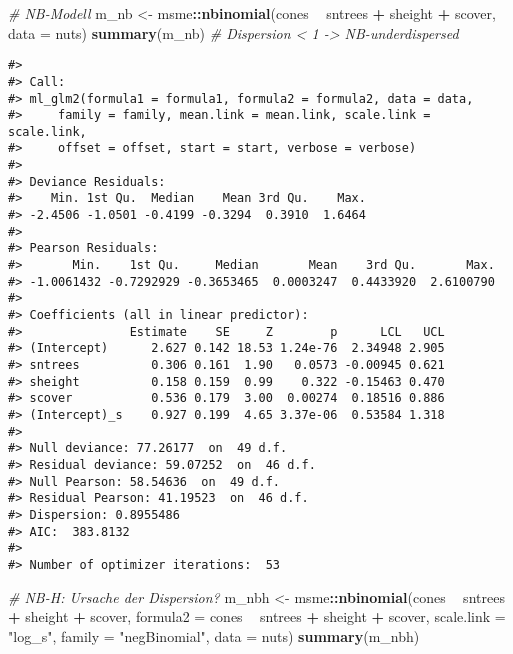 \documentclass[ngerman,a4paper,]{scrartcl}
\newenvironment{Shaded}{\begin{snugshade}}{\end{snugshade}}
\newcommand{\CommentTok}[1]{\textcolor[rgb]{0.56,0.35,0.01}{\textit{#1}}}
\newcommand{\DataTypeTok}[1]{\textcolor[rgb]{0.13,0.29,0.53}{#1}}
\newcommand{\KeywordTok}[1]{\textcolor[rgb]{0.13,0.29,0.53}{\textbf{#1}}}
\newcommand{\NormalTok}[1]{#1}
\newcommand{\OperatorTok}[1]{\textcolor[rgb]{0.81,0.36,0.00}{\textbf{#1}}}
\newcommand{\StringTok}[1]{\textcolor[rgb]{0.31,0.60,0.02}{#1}}
\theoremstyle{definition}
\theoremstyle{definition}
\theoremstyle{definition}
\theoremstyle{remark}
\begin{document}
\begin{Shaded}
\begin{Highlighting}[]
\CommentTok{# NB-Modell}
\NormalTok{m_nb <-}\StringTok{ }\NormalTok{msme}\OperatorTok{::}\KeywordTok{nbinomial}\NormalTok{(cones }\OperatorTok{~}\StringTok{ }\NormalTok{sntrees }\OperatorTok{+}\StringTok{ }\NormalTok{sheight }\OperatorTok{+}\StringTok{ }\NormalTok{scover, }\DataTypeTok{data =}\NormalTok{ nuts)}
\KeywordTok{summary}\NormalTok{(m_nb) }\CommentTok{# Dispersion < 1 -> NB-underdispersed}
\end{Highlighting}
\end{Shaded}

\begin{verbatim}
#> 
#> Call:
#> ml_glm2(formula1 = formula1, formula2 = formula2, data = data, 
#>     family = family, mean.link = mean.link, scale.link = scale.link, 
#>     offset = offset, start = start, verbose = verbose)
#> 
#> Deviance Residuals:
#>    Min. 1st Qu.  Median    Mean 3rd Qu.    Max. 
#> -2.4506 -1.0501 -0.4199 -0.3294  0.3910  1.6464 
#> 
#> Pearson Residuals:
#>       Min.    1st Qu.     Median       Mean    3rd Qu.       Max. 
#> -1.0061432 -0.7292929 -0.3653465  0.0003247  0.4433920  2.6100790 
#> 
#> Coefficients (all in linear predictor):
#>               Estimate    SE     Z        p      LCL   UCL
#> (Intercept)      2.627 0.142 18.53 1.24e-76  2.34948 2.905
#> sntrees          0.306 0.161  1.90   0.0573 -0.00945 0.621
#> sheight          0.158 0.159  0.99    0.322 -0.15463 0.470
#> scover           0.536 0.179  3.00  0.00274  0.18516 0.886
#> (Intercept)_s    0.927 0.199  4.65 3.37e-06  0.53584 1.318
#> 
#> Null deviance: 77.26177  on  49 d.f.
#> Residual deviance: 59.07252  on  46 d.f.
#> Null Pearson: 58.54636  on  49 d.f.
#> Residual Pearson: 41.19523  on  46 d.f.
#> Dispersion: 0.8955486
#> AIC:  383.8132
#> 
#> Number of optimizer iterations:  53
\end{verbatim}

\begin{Shaded}
\begin{Highlighting}[]
\CommentTok{# NB-H: Ursache der Dispersion?}
\NormalTok{m_nbh <-}\StringTok{ }\NormalTok{msme}\OperatorTok{::}\KeywordTok{nbinomial}\NormalTok{(cones }\OperatorTok{~}\StringTok{ }\NormalTok{sntrees }\OperatorTok{+}\StringTok{ }\NormalTok{sheight }\OperatorTok{+}\StringTok{ }\NormalTok{scover, }
                         \DataTypeTok{formula2 =}\NormalTok{ cones }\OperatorTok{~}\StringTok{ }\NormalTok{sntrees }\OperatorTok{+}\StringTok{ }\NormalTok{sheight }\OperatorTok{+}\StringTok{ }\NormalTok{scover,}
                         \DataTypeTok{scale.link =} \StringTok{"log_s"}\NormalTok{,}
                         \DataTypeTok{family =} \StringTok{"negBinomial"}\NormalTok{,}
                         \DataTypeTok{data =}\NormalTok{ nuts)}
\KeywordTok{summary}\NormalTok{(m_nbh)}
\end{Highlighting}
\end{Shaded}
\end{document}
